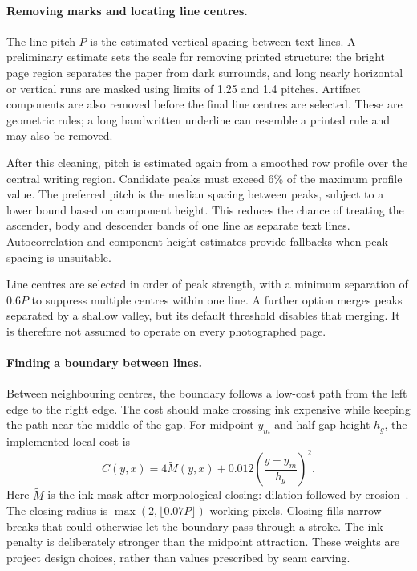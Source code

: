 \paragraph{Removing marks and locating line centres.}
The line pitch $P$ is the estimated vertical spacing between text lines. A preliminary estimate sets the scale for removing printed structure: the bright page region separates the paper from dark surrounds, and long nearly horizontal or vertical runs are masked using limits of 1.25 and 1.4 pitches. Artifact components are also removed before the final line centres are selected. These are geometric rules; a long handwritten underline can resemble a printed rule and may also be removed.

After this cleaning, pitch is estimated again from a smoothed row profile over the central writing region. Candidate peaks must exceed 6\% of the maximum profile value. The preferred pitch is the median spacing between peaks, subject to a lower bound based on component height. This reduces the chance of treating the ascender, body and descender bands of one line as separate text lines. Autocorrelation and component-height estimates provide fallbacks when peak spacing is unsuitable.

Line centres are selected in order of peak strength, with a minimum separation of $0.6P$ to suppress multiple centres within one line. A further option merges peaks separated by a shallow valley, but its default threshold disables that merging. It is therefore not assumed to operate on every photographed page.

\paragraph{Finding a boundary between lines.}
Between neighbouring centres, the boundary follows a low-cost path from the left edge to the right edge. The cost should make crossing ink expensive while keeping the path near the middle of the gap. For midpoint $y_m$ and half-gap height $h_g$, the implemented local cost is
\begin{equation}
C(y,x)=4\widetilde M(y,x)
+0.012\left(\frac{y-y_m}{h_g}\right)^2.
\label{eq:des-seamcost}
\end{equation}
Here $\widetilde M$ is the ink mask after morphological closing: dilation followed by erosion~\cite[p.~541]{haralick1987}. The closing radius is $\max(2,\lfloor0.07P\rfloor)$ working pixels. Closing fills narrow breaks that could otherwise let the boundary pass through a stroke. The ink penalty is deliberately stronger than the midpoint attraction. These weights are project design choices, rather than values prescribed by seam carving.

